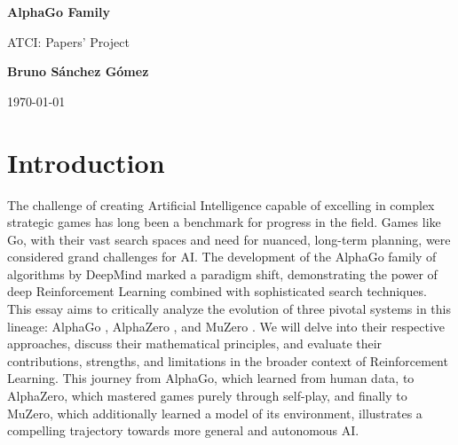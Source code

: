 \documentclass[11pt,a4paper]{article}
\author{Bruno Sánchez Gómez}
\date{\today}
\begin{document}
\begin{titlepage}
    \centering
    \vspace*{2cm}
    {\Huge \bfseries AlphaGo Family \par}
    \vspace{2cm}
    {\huge ATCI: Papers' Project \par}
    \vspace{10cm}
    {\large \textbf{Bruno Sánchez Gómez} \par}
    \vfill
    {\large \today \par}
\end{titlepage}

\begin{abstract}
The AlphaGo family of algorithms developed by DeepMind represents a series of landmark achievements in Artificial Intelligence (AI) and Reinforcement Learning (RL). This essay critically examines the evolution of these algorithms (AlphaGo, AlphaZero, and MuZero) by analyzing their core methodologies, mathematical foundations, and contributions to the field of RL. We trace their progression from leveraging human expertise to achieving superhuman performance via pure self-play, and ultimately to learning environment dynamics tabula rasa. This analysis highlights the key innovations, trade-offs, and enduring challenges in the quest for general-purpose learning agents capable of mastering complex sequential decision-making problems.
\end{abstract}

\section{Introduction}
The challenge of creating Artificial Intelligence capable of excelling in complex strategic games has long been a benchmark for progress in the field. Games like Go, with their vast search spaces and need for nuanced, long-term planning, were considered grand challenges for AI. The development of the AlphaGo family of algorithms by DeepMind marked a paradigm shift, demonstrating the power of deep Reinforcement Learning combined with sophisticated search techniques. This essay aims to critically analyze the evolution of three pivotal systems in this lineage: AlphaGo \cite{alphago}, AlphaZero \cite{alphazero}, and MuZero \cite{muzero}. We will delve into their respective approaches, discuss their mathematical principles, and evaluate their contributions, strengths, and limitations in the broader context of Reinforcement Learning. This journey from AlphaGo, which learned from human data, to AlphaZero, which mastered games purely through self-play, and finally to MuZero, which additionally learned a model of its environment, illustrates a compelling trajectory towards more general and autonomous AI.
\end{document}
